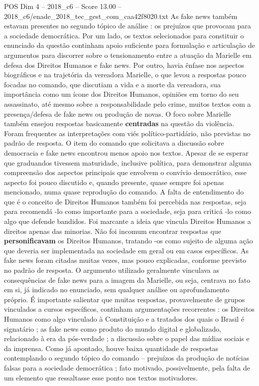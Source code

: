 \begin{textsample}{POS Dim 4 – 2018\_c6 – Score 13.00 – 2018\_c6/enade\_2018\_tec\_gest\_com\_caa42f8020.txt}
As fake news também estavam presentes no segundo tópico de análise : os prejuízos que provocam para a sociedade democrática.
Por um lado, os textos selecionados para constituir o enunciado da questão continham apoio suficiente para formulação e articulação de argumentos para discorrer sobre o tensionamento entre a atuação da Marielle em defesa dos Direitos Humanos e fake news.
Por outro, havia ênfase nos aspectos biográficos e na trajetória da vereadora Marielle, o que levou a respostas pouco focadas no comando, que discutiam a vida e a morte da vereadora, sua importância como um ícone dos Direitos Humanos, opiniões em torno do seu assassinato, até mesmo sobre a responsabilidade pelo crime, muitos textos com a presença/defesa de fake news ou produção de novas.
O foco sobre Marielle também ensejou respostas basicamente \textbf{centradas} na questão da violência.
Foram frequentes as interpretações com viés político-partidário, não previstas no padrão de resposta.
O item do comando que solicitava a discussão sobre democracia e fake news encontrou menos apoio nos textos.
Apesar de se esperar que graduandos tivessem maturidade, inclusive política, para demonstrar alguma compreensão dos aspectos principais que envolvem o convívio democrático, esse aspecto foi pouco discutido e, quando presente, quase sempre foi apenas mencionado, numa quase reprodução do comando.
A falta de entendimento do que é o conceito de Direitos Humanos também foi percebida nas respostas, seja para recomendá -lo como importante para a sociedade, seja para criticá -lo como algo que defende bandidos.
Foi marcante a ideia que vincula Direitos Humanos a direitos apenas das minorias.
Não foi incomum encontrar respostas que \textbf{personificavam} os Direitos Humanos, tratando -os como sujeito de alguma ação que deveria ser implementada na sociedade em geral ou em casos específicos.
As fake news foram citadas muitas vezes, mas pouco explicadas, conforme previsto no padrão de resposta.
O argumento utilizado geralmente vinculava as consequências de fake news para a imagem da Marielle, ou seja, centrava no fato em si, já indicado no enunciado, sem qualquer análise ou aprofundamento próprio.
É importante salientar que muitas respostas, provavelmente de grupos vinculados a cursos específicos, continham argumentações recorrentes : os Direitos Humanos como algo vinculado à Constituição e a tratados dos quais o Brasil é signatário ; as fake news como produto do mundo digital e globalizado, relacionado à era da pós-verdade ; a discussão sobre o papel das mídias sociais e da imprensa.
Como já apontado, houve baixa quantidade de respostas contemplando o segundo tópico do comando – prejuízos da produção de notícias falsas para a sociedade democrática ; fato motivado, possivelmente, pela falta de um elemento que ressaltasse esse ponto nos textos motivadores.

\end{textsample}
